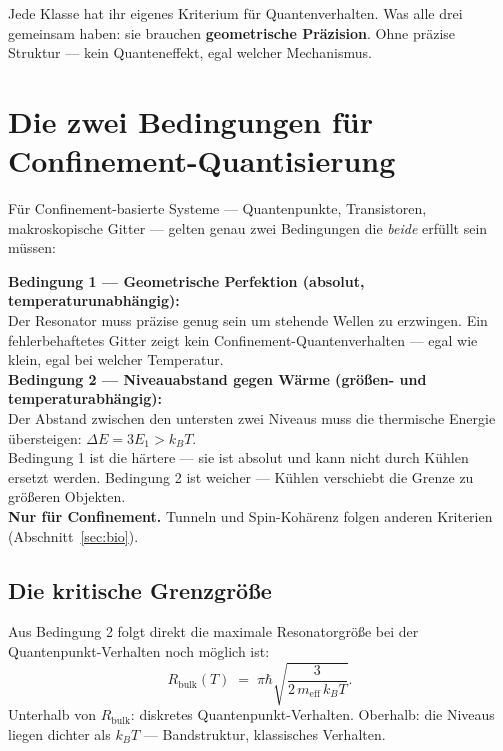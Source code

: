 Jede Klasse hat ihr eigenes Kriterium für Quantenverhalten.
Was alle drei gemeinsam haben: sie brauchen \textbf{geometrische
Präzision}. Ohne präzise Struktur --- kein Quanteneffekt,
egal welcher Mechanismus.

\section{Die zwei Bedingungen für Confinement-Quantisierung}
\label{sec:zwei-bedingungen}

Für Confinement-basierte Systeme --- Quantenpunkte, Transistoren,
makroskopische Gitter --- gelten genau zwei Bedingungen
die \emph{beide} erfüllt sein müssen:

\begin{important}
\textbf{Bedingung 1 --- Geometrische Perfektion (absolut, temperaturunabhängig):}\\
Der Resonator muss präzise genug sein um stehende Wellen zu erzwingen.
Ein fehlerbehaftetes Gitter zeigt kein Confinement-Quantenverhalten ---
egal wie klein, egal bei welcher Temperatur.\\[6pt]
\textbf{Bedingung 2 --- Niveauabstand gegen Wärme (größen- und temperaturabhängig):}\\
Der Abstand zwischen den untersten zwei Niveaus muss die
thermische Energie übersteigen: $\Delta E = 3E_1 > k_BT$.\\[6pt]
Bedingung 1 ist die härtere --- sie ist absolut und kann nicht
durch Kühlen ersetzt werden. Bedingung 2 ist weicher ---
Kühlen verschiebt die Grenze zu größeren Objekten.\\[4pt]
\textbf{Nur für Confinement.} Tunneln und Spin-Kohärenz
folgen anderen Kriterien (Abschnitt~\ref{sec:bio}).
\end{important}

\subsection{Die kritische Grenzgröße}

Aus Bedingung 2 folgt direkt die maximale Resonatorgröße
bei der Quantenpunkt-Verhalten noch möglich ist:
\begin{equation}
  \boxed{R_{\text{bulk}}(T) \;=\;
  \pi\hbar\sqrt{\frac{3}{2\,m_{\text{eff}}\,k_BT}}.}
\end{equation}
Unterhalb von $R_{\text{bulk}}$: diskretes Quantenpunkt-Verhalten.
Oberhalb: die Niveaus liegen dichter als $k_BT$ ---
Bandstruktur, klassisches Verhalten.

